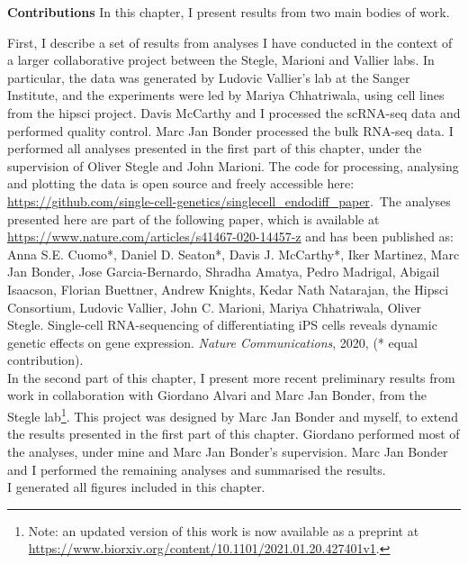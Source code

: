 \begin{Comment2}
\hspace{-3mm}\textbf{Contributions} 
In this chapter, I present results from two main bodies of work.

First, I describe a set of results from analyses I have conducted in the context of a larger collaborative project between the Stegle, Marioni and Vallier labs. 
In particular, the data was generated by Ludovic Vallier’s lab at the Sanger Institute, and the experiments were led by Mariya Chhatriwala, using cell lines from the \gls{hipsci} project.
Davis McCarthy and I processed the scRNA-seq data and performed quality control.
Marc Jan Bonder processed the bulk RNA-seq data.
I performed all analyses presented in the first part of this chapter, under the supervision of Oliver Stegle and John Marioni.
The code for processing, analysing and plotting the data is open source and freely accessible here: \url{https://github.com/single-cell-genetics/singlecell\_endodiff\_paper}.\
The analyses presented here are part of the following paper, which is available at \url{https://www.nature.com/articles/s41467-020-14457-z} and has been published as:\\

Anna S.E. Cuomo*, Daniel D. Seaton*, Davis J. McCarthy*, Iker Martinez, Marc Jan Bonder, Jose Garcia-Bernardo, Shradha Amatya, Pedro Madrigal, Abigail Isaacson, Florian Buettner, Andrew Knights, Kedar Nath Natarajan, the Hipsci Consortium, Ludovic Vallier, John C. Marioni, Mariya Chhatriwala, Oliver Stegle. Single-cell RNA-sequencing of differentiating iPS cells reveals dynamic genetic effects on gene expression. \textit{Nature Communications}, 2020, (* equal contribution).\\


In the second part of this chapter, I present more recent preliminary results from work in collaboration with Giordano Alvari and Marc Jan Bonder, from the Stegle lab\footnote{Note: an updated version of this work is now available as a preprint at \url{https://www.biorxiv.org/content/10.1101/2021.01.20.427401v1}.}.
This project was designed by Marc Jan Bonder and myself, to extend the results presented in the first part of this chapter.
Giordano performed most of the analyses, under mine and Marc Jan Bonder's supervision.
Marc Jan Bonder and I performed the remaining analyses and summarised the results.\\

I generated all figures included in this chapter. \\
\end{Comment2}


